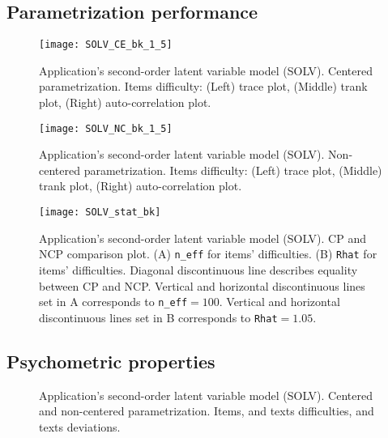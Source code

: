 \subsection{Parametrization performance} \label{app_c5:noncenter}

%
\begin{figure}[H]
	\centering
	\texttt{[image: SOLV\_CE\_bk\_1\_5]}
	\caption[Application's second-order latent variable model (SOLV). Centered parametrization. Items difficulty. Trace, trank and auto-correlation plots.]%
	{Application's second-order latent variable model (SOLV). Centered parametrization. Items difficulty: (Left) trace plot, (Middle) trank plot, (Right) auto-correlation plot.}
	\label{fig:SOLV_CE_appchains1}
\end{figure}

%
\begin{figure}[H]
	\centering
	\texttt{[image: SOLV\_NC\_bk\_1\_5]}
	\caption[Application's second-order latent variable model (SOLV). Non-centered parametrization. Items difficulty. Trace, trank and auto-correlation plots.]%
	{Application's second-order latent variable model (SOLV). Non-centered parametrization. Items difficulty: (Left) trace plot, (Middle) trank plot, (Right) auto-correlation plot.}
	\label{fig:SOLV_NC_appchains1}
\end{figure}
%
\begin{figure}[H]
	\centering
	\texttt{[image: SOLV\_stat\_bk]}
	\caption[Application's second-order latent variable model (SOLV). CP and NCP comparison plot.]%
	{Application's second-order latent variable model (SOLV). CP and NCP comparison plot. (A) \texttt{n\_eff} for items' difficulties. (B) \texttt{Rhat} for items' difficulties. Diagonal discontinuous line describes equality between CP and NCP. Vertical and horizontal discontinuous lines set in A corresponds to \texttt{n\_eff}$=100$. Vertical and horizontal discontinuous lines set in B corresponds to \texttt{Rhat}$=1.05$. }
	\label{fig:SOLV_stat_bk1}
\end{figure}



\subsection{Psychometric properties} \label{app_c5:psych}

%
\begin{figure}[H]
	\centering
	\begin{subfigure}
		\texttt{[image: SOLV\_recovery\_items]}
	\end{subfigure}
	\begin{subfigure}
		\texttt{[image: SOLV\_recovery\_texts]}
	\end{subfigure}
	\caption[Application's second-order latent variable model (SOLV). Centered and non-centered parametrization. Items, and texts difficulties, and texts deviations.]%
	{Application's second-order latent variable model (SOLV). Centered and non-centered parametrization. Items, and texts difficulties, and texts deviations.}
	\label{fig:SOLV_CE.NC_recovery}
\end{figure}
